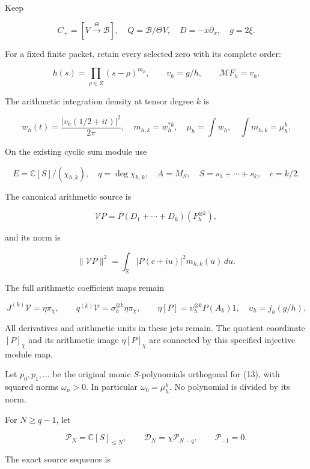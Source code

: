 \documentclass[
  11pt,
]{article}
\begin{document}
Keep

\[
 C_+=[V\xrightarrow{\Theta}\mathscr B],\quad
 Q=\mathscr B/\Theta V,\quad D=-x\partial_x,\quad g=2\xi.          \tag{8}
\]

For a fixed finite packet, retain every selected zero with its complete
order:

\[
 h(s)=\prod_{\rho\in Z}(s-\rho)^{m_\rho},\qquad
 v_h=g/h,\qquad\mathcal MF_h=v_h.                                \tag{9}
\]

The arithmetic integration density at tensor degree \(k\) is

\[
 w_h(t)=\frac{|v_h(1/2+it)|^2}{2\pi},\quad
 m_{h,k}=w_h^{*k},\quad
 \mu_h=\int w_h,\quad\int m_{h,k}=\mu_h^k.                        \tag{10}
\]

On the existing cyclic sum module use

\[
 E=\mathbb C[S]/(\chi_{h,k}),\quad q=\deg\chi_{h,k},\quad
 A=M_S,\quad S=s_1+\cdots+s_k,\quad c=k/2.                        \tag{11}
\]

The canonical arithmetic source is

\[
 \mathcal V P=P(D_1+\cdots+D_k)(F_h^{\otimes k}),                 \tag{12}
\]

and its norm is

\[
 \|\mathcal V P\|^2
 =\int_{\mathbb R}|P(c+iu)|^2m_{h,k}(u)\,du.                     \tag{13}
\]

The full arithmetic coefficient maps remain

\[
 J^{(k)}\mathcal V=\eta\pi_\chi,\qquad
 q^{(k)}\mathcal V=\sigma_h^{\otimes k}\eta\pi_\chi,\qquad
 \eta[P]=\upsilon_h^{\otimes k}P(A_k)1,\quad
 \upsilon_h=j_h(g/h).                                            \tag{14}
\]

All derivatives and arithmetic units in these jets remain. The quotient
coordinate \([P]_\chi\) and its arithmetic image \(\eta[P]_\chi\) are
connected by this specified injective module map.

Let \(p_0,p_1,\ldots\) be the original monic \(S\)-polynomials
orthogonal for (13), with squared norms \(\omega_n>0\). In particular
\(\omega_0=\mu_h^k\). No polynomial is divided by its norm.

For \(N\ge q-1\), let

\[
 \mathcal P_N=\mathbb C[S]_{\le N},\qquad
 \mathcal D_N=\chi\mathcal P_{N-q},\qquad
 \mathcal P_{-1}=0.                                               \tag{15}
\]

The exact source sequence is
\end{document}
